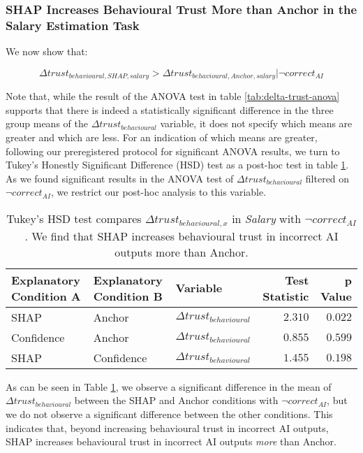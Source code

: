 \subsubsection{SHAP Increases Behavioural Trust More than Anchor in the Salary Estimation Task}
We now show that:

\begin{equation}
    \Delta trust_{behavioural,SHAP,salary} > \Delta trust_{behavioural,Anchor,salary} | \neg correct_{AI}
\end{equation}

\noindent Note that, while the result of the ANOVA test in table \ref{tab:delta-trust-anova} supports that there is indeed a statistically significant difference in the three group means of the $\Delta trust_{behavioural}$ variable, it does not specify which means are greater and which are less. For an indication of which means are greater, following our preregistered protocol for significant ANOVA results, we turn to Tukey's Honestly Significant Difference (HSD) test as a post-hoc test in table \ref{tab:delta-trust-hsd}. As we found significant results in the ANOVA test of $\Delta trust_{behavioural}$ filtered on $\neg correct_{AI}$, we restrict our post-hoc analysis to this variable.

\begin{table}[htb]
    \caption{Tukey's HSD test compares $\Delta trust_{behavioural,x}$ in \emph{Salary} with $\neg correct_{AI}$. We find that SHAP increases behavioural trust in incorrect AI outputs more than Anchor.}
    \label{tab:delta-trust-hsd}
    \begin{tabular}{lllrr}
        \toprule
        Explanatory Condition A & Explanatory Condition B & Variable & Test Statistic & p Value \\
        \midrule
        SHAP & Anchor & $\Delta trust_{behavioural}$ & $\mathbf{2.310}$ & $\mathbf{0.022}$ \\
        Confidence & Anchor & $\Delta trust_{behavioural}$ & $0.855$ & $0.599$ \\
        SHAP & Confidence & $\Delta trust_{behavioural}$ & $1.455$ & $0.198$ \\
        \bottomrule
    \end{tabular}
\end{table}

As can be seen in Table \ref{tab:delta-trust-hsd}, we observe a significant difference in the mean of $\Delta trust_{behavioural}$ between the SHAP and Anchor conditions with $\neg correct_{AI}$, but we do not observe a significant difference between the other conditions. This indicates that, beyond increasing behavioural trust in incorrect AI outputs, SHAP increases behavioural trust in incorrect AI outputs \emph{more} than Anchor.

